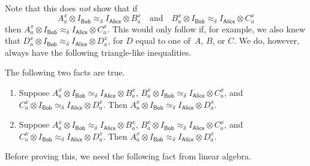 \documentclass[11pt]{article}
\newcommand{\consistency}{\simeq}
\newcommand{\reg}[1]{{\mathsf{#1}}}
\begin{document}
Note that this does \emph{not} show that if
\begin{equation*}
A^x_a \otimes I_{\reg{Bob}} \approx_\delta I_{\reg{Alice}} \otimes B^x_a
\quad\text{and}\quad
B^x_a \otimes I_{\reg{Bob}} \approx_\delta I_{\reg{Alice}} \otimes C^x_a
\end{equation*}
then $A^x_a \otimes I_{\reg{Bob}} \approx_\delta I_{\reg{Alice}} \otimes C^x_a$.
This would only follow if, for example, we also knew that $D^x_a \otimes I_{\reg{Bob}} \approx_\delta I_{\reg{Alice}} \otimes D^x_a$,
for $D$ equal to one of~$A$, $B$, or $C$.
We do, however, always have the following triangle-like inequalities.

\begin{fact}\label{fact:triangle-like}
The following two facts are true.
\begin{enumerate}
\item Suppose $A^x_a \otimes I_{\reg{Bob}} \consistency_\delta I_{\reg{Alice}} \otimes B^x_a$,
	$B^x_a \otimes I_{\reg{Bob}} \consistency_\delta I_{\reg{Alice}} \otimes C^x_a$,
	and $C^x_a \otimes I_{\reg{Bob}} \consistency_\delta I_{\reg{Alice}} \otimes D^x_a$.
	Then $A^x_a \otimes I_{\reg{Bob}} \consistency_\delta I_{\reg{Alice}} \otimes D^x_a$.
\item Suppose $A^x_a \otimes I_{\reg{Bob}} \approx_\delta I_{\reg{Alice}} \otimes B^x_a$,
	$B^x_a \otimes I_{\reg{Bob}} \approx_\delta I_{\reg{Alice}} \otimes C^x_a$,
	and $C^x_a \otimes I_{\reg{Bob}} \approx_\delta I_{\reg{Alice}} \otimes D^x_a$.
	Then $A^x_a \otimes I_{\reg{Bob}} \approx_\delta I_{\reg{Alice}} \otimes D^x_a$.
\end{enumerate}
\end{fact}

Before proving this, we need the following fact from linear algebra.
\end{document}
